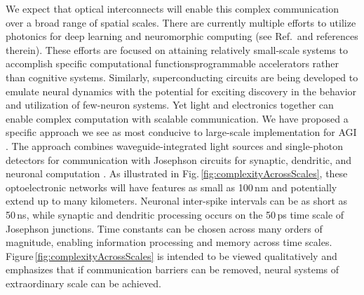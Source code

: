 \documentclass[twocolumn]{article}
\newcommand{\onlinecite}[1]{\hspace{-1 ex} \nocite{#1}\citenum{#1}}
\begin{document}
We expect that optical interconnects will enable this complex communication over a broad range of spatial scales. There are currently multiple efforts to utilize photonics for deep learning \cite{shha2016,chsa2018} and neuromorphic computing (see Ref.\,\onlinecite{prsh2017} and references therein). These efforts are focused on attaining relatively small-scale systems to accomplish specific computational functions\textemdash programmable accelerators rather than cognitive systems. Similarly, superconducting circuits are being developed to emulate neural dynamics \cite{hias2007,sele2017,scdo2018} with the potential for exciting discovery in the behavior and utilization of few-neuron systems. Yet light and electronics together can enable complex computation with scalable communication. We have proposed a specific approach we see as most conducive to large-scale implementation for AGI \cite{shbu2017,sh2018,sh2018_ICRC,sh2019_fluxonic}. The approach combines waveguide-integrated light sources and single-photon detectors for communication \cite{shbu2017,buch2017} with Josephson circuits for synaptic, dendritic, and neuronal computation \cite{sh2018,sh2019_fluxonic}. As illustrated in Fig.\,\ref{fig:complexityAcrossScales}, these optoelectronic networks will have features as small as 100\,nm and potentially extend up to many kilometers. Neuronal inter-spike intervals can be as short as 50\,ns, while synaptic and dendritic processing occurs on the 50\,ps time scale of Josephson junctions. Time constants can be chosen across many orders of magnitude, enabling information processing and memory across time scales. Figure\,\ref{fig:complexityAcrossScales} is intended to be viewed qualitatively and emphasizes that if communication barriers can be removed, neural systems of extraordinary scale can be achieved.
\end{document}
